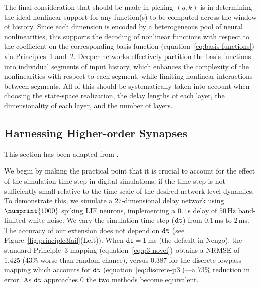 The final consideration that should be made in picking $(q, k)$ is in determining the ideal nonlinear support for any function(s) to be computed across the window of history.
Since each dimension is encoded by a heterogeneous pool of neural nonlinearities, this supports the decoding of nonlinear functions with respect to the coefficient on the corresponding basis function (equation~\ref{eq:basis-functions}) via Principles~1 and~2.
Deeper networks effectively partition the basis functions into individual segments of input history, which enhances the complexity of the nonlinearities with respect to each segment, while limiting nonlinear interactions between segments.
All of this should be systematically taken into account when choosing the state-space realization, the delay lengths of each layer, the dimensionality of each layer, and the number of layers.

\subsection{Harnessing Higher-order Synapses}
\label{sec:pure_delay}

This section has been adapted from \citet{voelker2018}.


We begin by making the practical point that it is crucial to account for the effect of the simulation time-step in digital simulations, if the time-step is not sufficiently small relative to the time scale of the desired network-level dynamics.
To demonstrate this, we simulate a $27$-dimensional delay network using $\numprint{1000}$ spiking LIF neurons, implementing a $0.1$\,s delay of $50$\,Hz band-limited white noise.
We vary the simulation time-step ($\texttt{dt}{}$) from $0.1$\,ms to $2$\,ms.
The accuracy of our extension does not depend on $\texttt{dt}{}$ (see Figure~\ref{fig:principle3fail}(Left)).
When $\texttt{dt}{}=1$\,ms (the default in Nengo), the standard Principle~3 mapping (equation~\ref{eq:p3-novel}) obtains a NRMSE of $1.425$ ($43\%$ worse than random chance), versus $0.387$ for the discrete lowpass mapping which accounts for $\texttt{dt}{}$ (equation~\ref{eq:discrete-p3})---a $73\%$ reduction in error.
As $\texttt{dt}{}$ approaches $0$ the two methods become equivalent.

